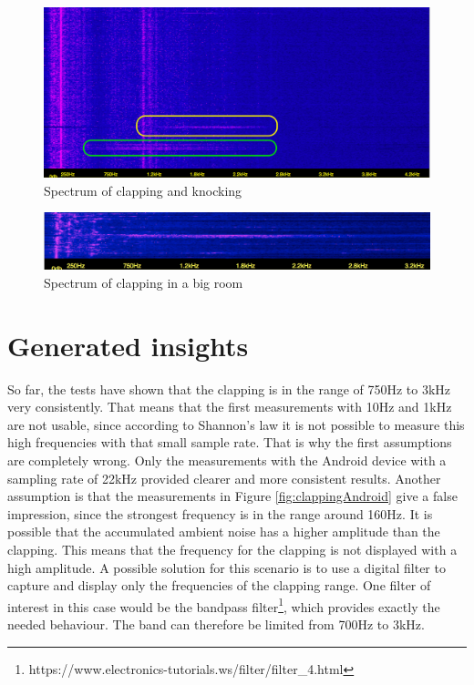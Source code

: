 \newpage
\begin{figure}[h]
	\centering
	\includegraphics[width=\textwidth, trim={0 0 2cm 5cm},clip]{imgs/iSpectrumClappingKnocking}
	\caption{Spectrum of clapping and knocking}
	\label{fig:clappingKnocking}
\end{figure}
\begin{figure}[h]
	\centering
	\includegraphics[width=\textwidth]{imgs/iSpectrumClappingE2}
	\caption{Spectrum of clapping in a big room}
	\label{fig:clappingE2}
\end{figure}
\section{Generated insights}
So far, the tests have shown that the clapping is in the range of 750Hz to 3kHz very consistently. That means that the first measurements with 10Hz and 1kHz are not usable, since according to Shannon's law it is not possible to measure this high frequencies with that small sample rate. That is why the first assumptions are completely wrong. Only the measurements with the Android device with a sampling rate of 22kHz provided clearer and more consistent results. Another assumption is that the measurements in Figure \ref{fig:clappingAndroid} give a false impression, since the strongest frequency is in the range around 160Hz. It is possible that the accumulated ambient noise has a higher amplitude than the clapping. This means that the frequency for the clapping is not displayed with a high amplitude. A possible solution for this scenario is to use a digital filter to capture and display only the frequencies of the clapping range. One filter of interest in this case would be the bandpass filter\footnote{https://www.electronics-tutorials.ws/filter/filter\_4.html}, which provides exactly the needed behaviour. The band can therefore be limited from 700Hz to 3kHz.